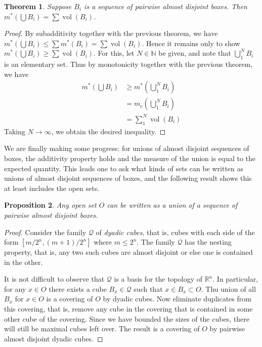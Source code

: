 \documentclass[11pt,oneside]{amsbook}
\newcommand{\NN}{{\mathbb N}}
\newcommand{\RR}{{\mathbb R}}
\DeclareMathOperator{\vol}{vol}
\theoremstyle{definition}
\theoremstyle{plain}
\newtheorem{thm}{Theorem}[section]
\newtheorem{prop}[thm]{Proposition}
\theoremstyle{definition}
\theoremstyle{remark}
\numberwithin{equation}{section}
\numberwithin{figure}{section}
\begin{document}
\begin{thm}
  Suppose $B_i$ is a sequence of pairwise almost disjoint boxes. Then $m^*(\bigcup B_i)=\sum\vol(B_i)$.
\end{thm}

\begin{proof}
  By subadditivity together with the previous theorem, we have $m^*(\bigcup B_i)\leq\sum m^*(B_i)=\sum\vol(B_i)$. Hence it remains only to show $m^*(\bigcup B_i)\geq\sum\vol(B_i)$. For this, let $N\in\NN$ be given, and note that $\bigcup_1^NB_i$ is an elementary set. Thus by monotonicity together with the previous theorem, we have
  \begin{align*}
    m^*(\bigcup B_i)&\geq m^*(\bigcup_1^NB_i)\\
                    &=m_e(\bigcup_1^NB_i)\\
                    &=\sum_1^N\vol(B_i)
  \end{align*}
  Taking $N\to\infty$, we obtain the desired inequality.
\end{proof}

We are finally making some progress: for unions of almost disjoint sequences of boxes, the additivity property holds and the measure of the union is equal to the expected quantity. This leads one to ask what kinds of sets can be written as unions of almost disjoint sequences of boxes, and the following result shows this at least includes the open sets.

\begin{prop}
  Any open set $O$ can be written as a union of a sequence of pairwise almost disjoint boxes.
\end{prop}

\begin{proof}
  Consider the family $\mathcal Q$ of \emph{dyadic cubes}, that is, cubes with each side of the form $[m/2^n,(m+1)/2^n]$ where $m\leq 2^n$. The family $\mathcal Q$ has the nesting property, that is, any two such cubes are almost disjoint or else one is contained in the other.

  It is not difficult to observe that $\mathcal Q$ is a basis for the topology of $\RR^n$. In particular, for any $x\in O$ there exists a cube $B_x\in\mathcal Q$ such that $x\in B_x\subset O$. Thu union of all $B_x$ for $x\in O$ is a covering of $O$ by dyadic cubes. Now eliminate duplicates from this covering, that is, remove any cube in the covering that is contained in some other cube of the covering. Since we have bounded the sizes of the cubes, there will still be maximal cubes left over. The result is a covering of $O$ by pairwise almost disjoint dyadic cubes.
\end{proof}
\end{document}
